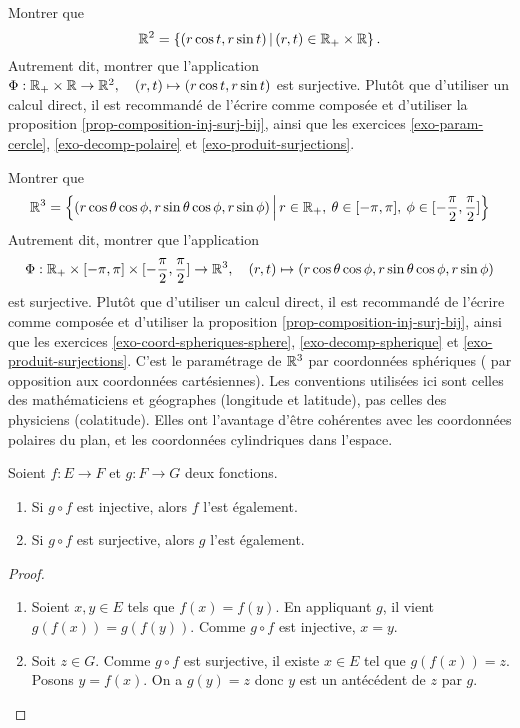 \begin{exercice}\label{exo-coord-polaires-plan}
Montrer que 
\[\R^2 = \ensemble{(r\cos t, r\sin t)}{(r,t) \in \R_+\times \R}.\]
Autrement dit, montrer que l'application $\Phi : \mathbb{R}_+\times \mathbb{R} \to \mathbb{R}^2, \quad (r,t) \mapsto (r\cos t, r\sin t)$ est surjective. Plutôt que d'utiliser un calcul direct, il est recommandé de l'écrire comme composée et d'utiliser la proposition \ref{prop-composition-inj-surj-bij}, ainsi que les exercices \ref{exo-param-cercle}, \ref{exo-decomp-polaire}  et \ref{exo-produit-surjections}.
\end{exercice}

\begin{exercice}\label{exo-coord-spheriques-espace}
Montrer que 
\[ \R^3 = \ensemble{(r\cos\theta\cos\phi, r\sin\theta\cos\phi, r\sin\phi)}{r\in\R_+, \: \theta \in [-\pi,\pi], \: \phi\in[-\frac{\pi}{2},\frac{\pi}{2}]}\]
Autrement dit, montrer que l'application 
\[\Phi : \mathbb{R}_+\times [-\pi,\pi]\times [-\frac{\pi}{2},\frac{\pi}{2}] \to \mathbb{R}^3, \quad 
(r,t) \mapsto (r\cos\theta\cos\phi, r\sin\theta\cos\phi, r\sin\phi)
\]
est surjective. Plutôt que d'utiliser un calcul direct, il est recommandé de l'écrire comme composée et d'utiliser la proposition \ref{prop-composition-inj-surj-bij}, ainsi que les exercices \ref{exo-coord-spheriques-sphere}, \ref{exo-decomp-spherique}  et \ref{exo-produit-surjections}.
C'est le paramétrage de $\mathbb{R}^3$ par coordonnées sphériques  ( par opposition aux coordonnées cartésiennes). Les conventions utilisées ici sont celles des mathématiciens et géographes (longitude et latitude), pas celles des physiciens (colatitude). Elles ont l'avantage d'être cohérentes avec les coordonnées polaires du plan, et les coordonnées cylindriques dans l'espace.
\end{exercice}


\begin{proposition}
Soient $f : E\to F$ et $g : F\to G$ deux fonctions.
\begin{enumerate}
\item Si $g\circ f$ est injective, alors $f$ l'est également.
\item Si $g\circ f$ est surjective, alors $g$ l'est également.
\end{enumerate}
\end{proposition}
\begin{proof}
\begin{enumerate}
\item Soient $x, y\in E$ tels que $f(x)=f(y)$. En appliquant $g$, il vient $g(f(x))=g(f(y))$. Comme $g\circ f$ est injective, $x=y$.
\item Soit $z\in G$. Comme $g\circ f$ est surjective, il existe $x\in E$ tel que $g(f(x))=z$. Posons $y = f(x)$. On a $g(y)=z$ donc $y$ est un antécédent de $z$ par $g$.
\end{enumerate}
\end{proof}




